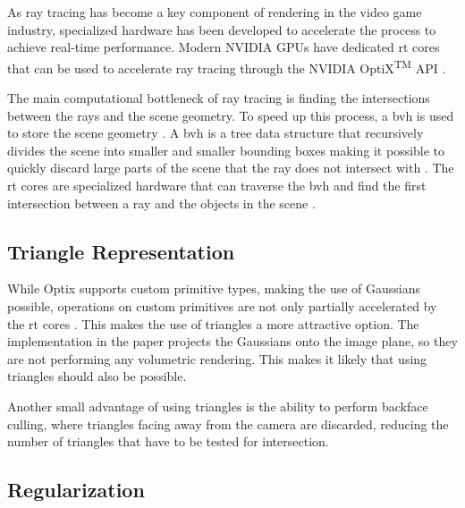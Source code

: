 As ray tracing has become a key component of rendering in the video game industry, specialized hardware has been developed to accelerate the process to achieve real-time performance.
Modern NVIDIA GPUs have dedicated \gls{rt} cores that can be used to accelerate ray tracing through the NVIDIA OptiX\textsuperscript{TM} API \cite{nvidiaNVIDIAOptiXProgramming2023}.

The main computational bottleneck of ray tracing is finding the intersections between the rays and the scene geometry.
To speed up this process, a \gls{bvh} is used to store the scene geometry \cite{nvidiaNVIDIAOptiXProgramming2023}.
A \gls{bvh} is a tree data structure that recursively divides the scene into smaller and smaller bounding boxes making it possible to quickly discard large parts of the scene that the ray does not intersect with \cite{nvidiaNVIDIAOptiXProgramming2023}.
The \gls{rt} cores are specialized hardware that can traverse the \gls{bvh} and find the first intersection between a ray and the objects in the scene \cite{nvidiaNVIDIAOptiXProgramming2023}.

\subsection{Triangle Representation}
While Optix supports custom primitive types, making the use of Gaussians possible, operations on custom primitives are not only partially accelerated by the \gls{rt} cores \cite{nvidiaOptiXQuickStart2018}\cite{nvidiaNVIDIAOptiXProgramming2023}.
This makes the use of triangles a more attractive option.
The implementation in the paper projects the Gaussians onto the image plane, so they are not performing any volumetric rendering.
This makes it likely that using triangles should also be possible.



Another small advantage of using triangles is the ability to perform backface culling, where triangles facing away from the camera are discarded, reducing the number of triangles that have to be tested for intersection.

\subsection{Regularization}


